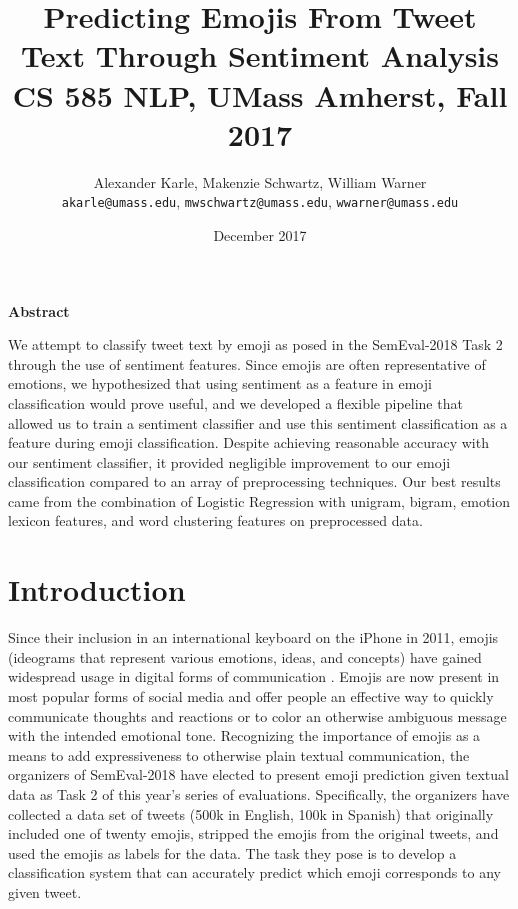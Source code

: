 \documentclass[11pt]{article}
\title{\textbf{Predicting Emojis From Tweet Text Through Sentiment Analysis} \\
\large CS 585 NLP, UMass Amherst, Fall 2017}
\author{
  Alexander Karle, Makenzie Schwartz, William Warner \\
  \texttt{akarle@umass.edu}, \texttt{mwschwartz@umass.edu}, \texttt{wwarner@umass.edu} }
\date{December 2017}
\begin{document}
\maketitle
\begin{center}
\textbf{\large Abstract}    
\end{center}


We attempt to classify tweet text by emoji as posed in the SemEval-2018 Task 2 through the use of sentiment features. Since emojis are often representative of emotions, we hypothesized that using sentiment as a feature in emoji classification would prove useful, and we developed a flexible pipeline that allowed us to train a sentiment classifier and use this sentiment classification as a feature during emoji classification. Despite achieving reasonable accuracy with our sentiment classifier, it provided negligible improvement to our emoji classification compared to an array of preprocessing techniques. Our best results came from the combination of Logistic Regression with unigram, bigram, emotion lexicon features, and word clustering features on preprocessed data.

\section{Introduction}
Since their inclusion in an international keyboard on the iPhone in 2011, emojis (ideograms that represent various emotions, ideas, and concepts) have gained widespread usage in digital forms of communication \cite{blagdon2013}. Emojis are now present in most popular forms of social media and offer people an effective way to quickly communicate thoughts and reactions or to color an otherwise ambiguous message with the intended emotional tone. Recognizing the importance of emojis as a means to add expressiveness to otherwise plain textual communication, the organizers of SemEval-2018 have elected to present emoji prediction given textual data as Task 2 of this year's series of evaluations. Specifically, the organizers have collected a data set of tweets (500k in English, 100k in Spanish) that originally included one of twenty emojis, stripped the emojis from the original tweets, and used the emojis as labels for the data. The task they pose is to develop a classification system that can accurately predict which emoji corresponds to any given tweet.
\end{document}
